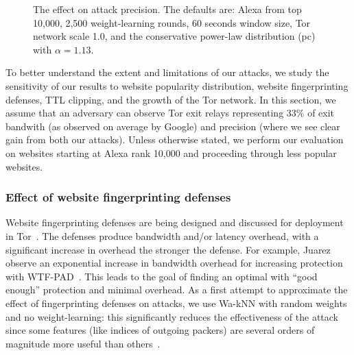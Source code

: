 \begin{figure}[t]
{    \label{fig:fpt:var:scale}
}
\caption{The effect on attack precision. The defaults are: Alexa from top 10,000,
2,500 weight-learning rounds,
60 seconds window size, Tor network scale 1.0, and the conservative
power-law distribution (pc) with $\alpha=1.13$.}
\label{fig:fpt:var}
\end{figure}
\fi

To better understand the extent and limitations of our attacks, we
study the sensitivity of our results to website popularity distribution,
website fingerprinting defenses, TTL clipping, and the growth of the Tor
network.  In this section, we assume that an adversary can observe Tor
exit relays representing 33\% of exit bandwith (as observed on average
by Google) and precision (where we see clear gain from both our
attacks).  Unless otherwise stated, we perform our evaluation on
websites starting at Alexa rank 10,000 and proceeding through less
popular websites.



\subsubsection{Effect of website fingerprinting defenses}

Website fingerprinting defenses are being
designed and discussed for deployment in Tor~\cite{adapativepadding}.
The defenses produce bandwidth and/or latency overhead, with a significant
increase in overhead the stronger the defense. For example, Juarez \ea
observe an exponential increase in bandwidth overhead for increasing protection
with WTF-PAD~\cite{DBLP:journals/corr/JuarezIPDW15}.
This leads to the goal of finding an optimal with ``good enough''
protection and minimal overhead.
As a first attempt to approximate the effect of fingerprinting
defenses on \name attacks, we use Wa-kNN with
random weights and no weight-learning: this significantly reduces the
effectiveness of the attack since some features (like indices of outgoing
packers) are several orders of magnitude more useful
than others~\cite{DBLP:journals/corr/JuarezIPDW15}.

